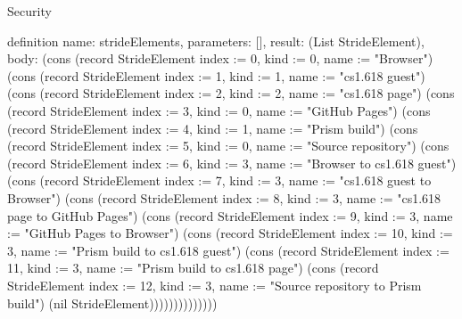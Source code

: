 \begin{lexlean}{Security}
\begin{semanticmodule}
definition{
  name: strideElements,
  parameters: [],
  result: (List StrideElement),
  body: (cons (record StrideElement {index := 0, kind := 0, name := "Browser"}) (cons (record StrideElement {index := 1, kind := 1, name := "cs1.618 guest"}) (cons (record StrideElement {index := 2, kind := 2, name := "cs1.618 page"}) (cons (record StrideElement {index := 3, kind := 0, name := "GitHub Pages"}) (cons (record StrideElement {index := 4, kind := 1, name := "Prism build"}) (cons (record StrideElement {index := 5, kind := 0, name := "Source repository"}) (cons (record StrideElement {index := 6, kind := 3, name := "Browser to cs1.618 guest"}) (cons (record StrideElement {index := 7, kind := 3, name := "cs1.618 guest to Browser"}) (cons (record StrideElement {index := 8, kind := 3, name := "cs1.618 page to GitHub Pages"}) (cons (record StrideElement {index := 9, kind := 3, name := "GitHub Pages to Browser"}) (cons (record StrideElement {index := 10, kind := 3, name := "Prism build to cs1.618 guest"}) (cons (record StrideElement {index := 11, kind := 3, name := "Prism build to cs1.618 page"}) (cons (record StrideElement {index := 12, kind := 3, name := "Source repository to Prism build"}) (nil StrideElement))))))))))))))
}


\end{semanticmodule}
\end{lexlean}
